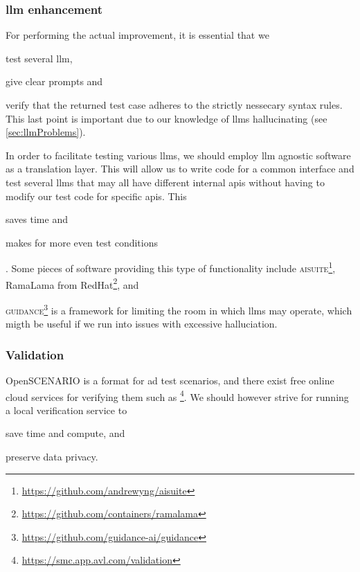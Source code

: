 \subsubsection{\acrshort{llm} enhancement}\label{sec:llmEnhancement}

For performing the actual improvement, it is essential that we \begin{inparaenum}
    \item test several \acrshort{llm},
    \item give clear prompts
    and
    \item verify that the returned test case adheres to the strictly nessecary
    syntax rules. This last point is important due to our knowledge of
    \acrshort{llms} hallucinating (see \cref{sec:llmProblems}).
\end{inparaenum}

In order to facilitate testing various \acrlong{llms}, we should employ
\acrshort{llm} agnostic software as a translation layer. This will allow us to
write code for a common interface and test several \acrshort{llms} that may all
have different internal \acrfull{apis} without having to modify our test code
for specific \acrshort{apis}. This \begin{inparaenum}
    \item saves time 
    and
    \item makes for more even test conditions
\end{inparaenum}.
Some pieces of software providing this type of functionality include
\textsc{aisuite}\footnote{\url{https://github.com/andrewyng/aisuite}}, RamaLama
from RedHat\footnote{\url{https://github.com/containers/ramalama}}, and 

\textsc{guidance}\footnote{\url{https://github.com/guidance-ai/guidance}} is a
framework for limiting the room in which \acrshort{llms} may operate, which
migth be useful if we run into issues with excessive halluciation.


\subsubsection{Validation}

OpenSCENARIO is a format for \acrshort{ad} test scenarios, and there exist free
online cloud services for verifying them such as
\footnote{\url{https://smc.app.avl.com/validation}}. We should however strive for 
running a local verification service to \begin{inparaenum}
    \item save time and compute,
    and
    \item preserve data privacy.
\end{inparaenum}

